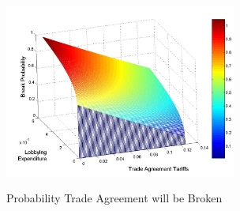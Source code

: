 \documentclass[10pt]{article}
\begin{document}
\begin{figure}
\begin{center}
\includegraphics[height=2.5in, width=3in]{brprob2.jpg}
\end{center}
\caption{Probability Trade Agreement will be Broken\label{fig:br}}
\end{figure}

\end{document}

